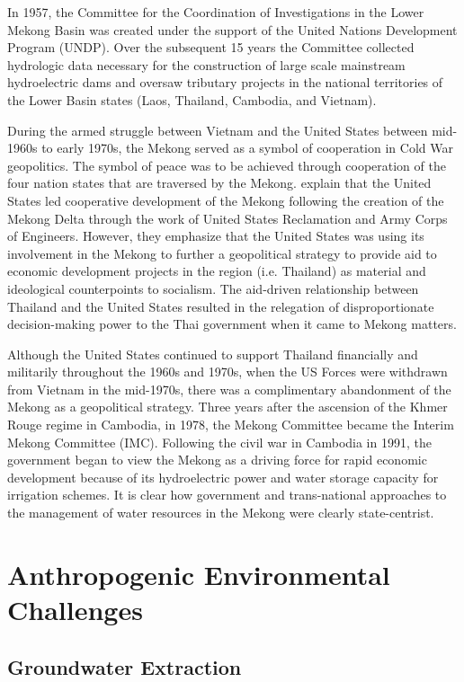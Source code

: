   In 1957, the Committee for the Coordination of Investigations in the Lower Mekong Basin was created under the support of the United Nations Development Program (UNDP). Over the subsequent 15 years the Committee collected hydrologic data necessary for the construction of large scale mainstream hydroelectric dams and oversaw tributary projects in the national territories of the Lower Basin states (Laos, Thailand, Cambodia, and Vietnam).
  
  During the armed struggle between Vietnam and the United States between mid-1960s to early 1970s, the Mekong served as a symbol of cooperation in Cold War geopolitics. The symbol of peace was to be achieved through cooperation of the four nation states that are traversed by the Mekong. \citet{sneddon2006rethinking}  explain that the United States led cooperative development of the Mekong following the creation of the Mekong Delta through the work of United States Reclamation and Army Corps of Engineers. However, they emphasize that the United States was using its involvement in the Mekong to further a geopolitical strategy to provide aid to economic development projects in the region (i.e. Thailand) as material and ideological counterpoints to socialism. The aid-driven relationship between Thailand and the United States resulted in the relegation of disproportionate decision-making power to the Thai government when it came to Mekong matters.
  
  
Although the United States continued to support Thailand financially and militarily throughout the 1960s and 1970s, when the US Forces were withdrawn from Vietnam in the mid-1970s, there was a complimentary abandonment of the Mekong as a geopolitical strategy. Three years after the ascension of the Khmer Rouge regime in Cambodia, in 1978, the Mekong Committee became the Interim Mekong Committee (IMC). Following the civil war in Cambodia in 1991, the government began to view the Mekong as a driving force for rapid economic development because of its hydroelectric power and water storage capacity for irrigation schemes. It is clear how government and trans-national approaches to the management of water resources in the Mekong were clearly state-centrist. 

\section{Anthropogenic Environmental Challenges}

\subsection{Groundwater Extraction}

